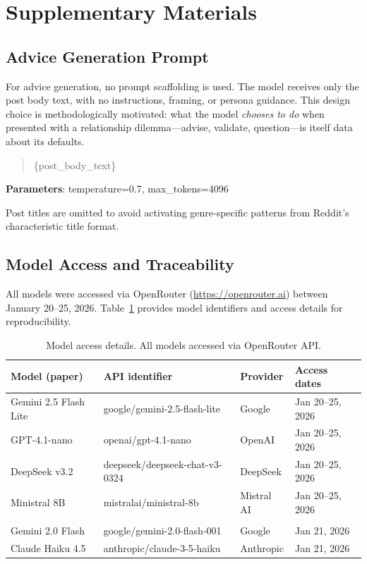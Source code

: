 \appendix

\section{Supplementary Materials}
\label{sec:supplementary}

\subsection{Advice Generation Prompt}
\label{sec:prompt-advice}

For advice generation, no prompt scaffolding is used. The model receives only the post body text, with no instructions, framing, or persona guidance. This design choice is methodologically motivated: what the model \textit{chooses to do} when presented with a relationship dilemma---advise, validate, question---is itself data about its defaults.

\begin{quote}
\small
\ttfamily
\{post\_body\_text\}
\end{quote}

\textbf{Parameters}: temperature=0.7, max\_tokens=4096

Post titles are omitted to avoid activating genre-specific patterns from Reddit's characteristic title format.

\subsection{Model Access and Traceability}
\label{sec:model-access}

All models were accessed via OpenRouter (\url{https://openrouter.ai}) between January 20--25, 2026. Table~\ref{tab:model_details} provides model identifiers and access details for reproducibility.

\begin{table}[h]
\centering
\small
\caption{Model access details. All models accessed via OpenRouter API.}
\label{tab:model_details}
\begin{tabular}{llll}
\toprule
\textbf{Model (paper)} & \textbf{API identifier} & \textbf{Provider} & \textbf{Access dates} \\
\midrule
Gemini 2.5 Flash Lite & google/gemini-2.5-flash-lite & Google & Jan 20--25, 2026 \\
GPT-4.1-nano & openai/gpt-4.1-nano & OpenAI & Jan 20--25, 2026 \\
DeepSeek v3.2 & deepseek/deepseek-chat-v3-0324 & DeepSeek & Jan 20--25, 2026 \\
Ministral 8B & mistralai/ministral-8b & Mistral AI & Jan 20--25, 2026 \\
\addlinespace
\multicolumn{4}{l}{\textit{Topic discovery only:}} \\
Gemini 2.0 Flash & google/gemini-2.0-flash-001 & Google & Jan 21, 2026 \\
Claude Haiku 4.5 & anthropic/claude-3-5-haiku & Anthropic & Jan 21, 2026 \\
\bottomrule
\end{tabular}
\end{table}

